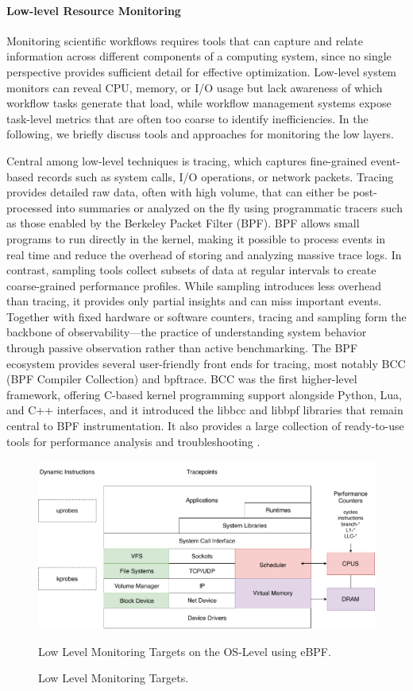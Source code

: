 \paragraph{Low-level Resource Monitoring}
Monitoring scientific workflows requires tools that can capture and relate information across different components of a computing system, since no single perspective provides sufficient detail for effective optimization. Low-level system monitors can reveal CPU, memory, or I/O usage but lack awareness of which workflow tasks generate that load, while workflow management systems expose task-level metrics that are often too coarse to identify inefficiencies. In the following, we briefly discuss tools and approaches for monitoring the low layers.

Central among low-level techniques is tracing, which captures fine-grained event-based records such as system calls, I/O operations, or network packets. Tracing provides detailed raw data, often with high volume, that can either be post-processed into summaries or analyzed on the fly using programmatic tracers such as those enabled by the Berkeley Packet Filter (BPF). BPF allows small programs to run directly in the kernel, making it possible to process events in real time and reduce the overhead of storing and analyzing massive trace logs. In contrast, sampling tools collect subsets of data at regular intervals to create coarse-grained performance profiles. While sampling introduces less overhead than tracing, it provides only partial insights and can miss important events. Together with fixed hardware or software counters, tracing and sampling form the backbone of observability—the practice of understanding system behavior through passive observation rather than active benchmarking.
The BPF ecosystem provides several user-friendly front ends for tracing, most notably BCC (BPF Compiler Collection) and bpftrace. BCC was the first higher-level framework, offering C-based kernel programming support alongside Python, Lua, and C++ interfaces, and it introduced the libbcc and libbpf libraries that remain central to BPF instrumentation. It also provides a large collection of ready-to-use tools for performance analysis and troubleshooting \cite{gregg2020bpf}.

\begin{figure}[H]
    \centering
    \includegraphics[scale=0.4]{fig/02/02-ebpf-os.pdf}
    \caption{Low Level Monitoring Targets.}
    \label{fig:02-ebpf-os}
    \tiny
    Low Level Monitoring Targets on the OS-Level using eBPF.
\end{figure}

